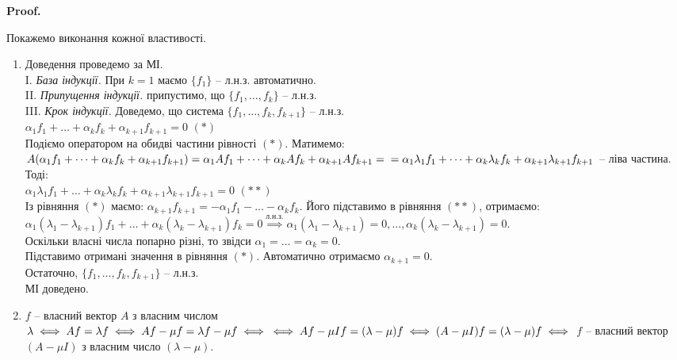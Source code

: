\documentclass[a4paper, 10pt]{article}
\makeatletter
\theoremstyle{theoremdd}
\renewenvironment{proof}[1][Proof.\\]{\par
\pushQED{\hfill \qed}%
\normalfont \topsep6\p@\@plus6\p@\relax
\trivlist
\item\relax
{\bfseries
#1\@addpunct{.}}\hspace\labelsep\ignorespaces
}{%
\popQED\endtrivlist\@endpefalse
}
\makeatother
\begin{document}
\begin{proof}
Покажемо виконання кожної властивості.
\begin{enumerate}[wide=0pt, label={\arabic*)},topsep=-\parskip]
\item Доведення проведемо за МІ.\\
I. \textit{База індукції.} При $k=1$ маємо $\{f_1\}$ -- л.н.з. автоматично.\\
II. \textit{Припущення індукції.} припустимо, що $\{f_1,\dots,f_k\}$ -- л.н.з. \\
III. \textit{Крок індукції.} Доведемо, що система $\{f_1,\dots,f_k, f_{k+1}\}$ -- л.н.з.\\
$\alpha_1 f_1 + \dots + \alpha_k f_k + \alpha_{k+1} f_{k+1} = 0$ $(*)$\\
Подіємо оператором на обидві частини рівності $(*)$. Матимемо:\\
$A(\alpha_1 f_1 + \dots + \alpha_k f_k + \alpha_{k+1} f_{k+1}) = \alpha_1 Af_1 + \dots + \alpha_k Af_k + \alpha_{k+1} Af_{k+1} = \\ = \alpha_1 \lambda_1 f_1 + \dots + \alpha_k \lambda_k f_k + \alpha_{k+1} \lambda_{k+1} f_{k+1}$ -- ліва частина. Тоді:\\
$\alpha_1 \lambda_1 f_1 + \dots + \alpha_k \lambda_k f_k + \alpha_{k+1} \lambda_{k+1} f_{k+1} = 0$ $(**)$\\
Із рівняння $(*)$ маємо: $\alpha_{k+1}f_{k+1} = -\alpha_1 f_1 - \dots - \alpha_k f_k$. Його підставимо в рівняння $(**)$, отримаємо:\\
$\alpha_1 (\lambda_1 - \lambda_{k+1})f_1 + \dots + \alpha_k (\lambda_k - \lambda_{k+1})f_k = 0 \overset{\textrm{л.н.з.}}{\implies} \alpha_1(\lambda_1 - \lambda_{k+1})=0, \dots, \alpha_k(\lambda_k - \lambda_{k+1}) = 0$.\\
Оскільки власні числа попарно різні, то звідси $\alpha_1 = \dots = \alpha_k = 0$.\\
Підставимо отримані значення в рівняння $(*)$. Автоматично отримаємо $\alpha_{k+1} = 0$.\\
Остаточно, $\{f_1,\dots,f_k, f_{k+1}\}$ -- л.н.з.\\
МІ доведено.

\item $f$ -- власний вектор $A$ з власним числом $\lambda \iff Af = \lambda f \iff Af - \mu f = \lambda f - \mu f \iff \\ \iff Af - \mu If = (\lambda - \mu)f \iff (A-\mu I)f = (\lambda - \mu)f \iff$ $f$ -- власний вектор $(A- \mu I)$ з власним число $(\lambda - \mu)$.


\end{enumerate}
\end{proof}
\end{document}
